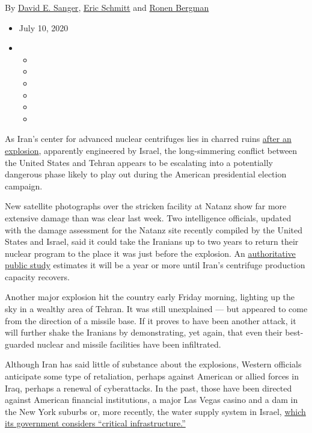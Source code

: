 By \href{https://www.nytimes.com/by/david-e-sanger}{David E. Sanger},
\href{https://www.nytimes.com/by/eric-schmitt}{Eric Schmitt} and
\href{https://www.nytimes.com/by/ronen-bergman}{Ronen Bergman}

\begin{itemize}
\item
  July 10, 2020
\item
  \begin{itemize}
  \item
  \item
  \item
  \item
  \item
  \item
  \end{itemize}
\end{itemize}

As Iran's center for advanced nuclear centrifuges lies in charred ruins
\href{https://www.nytimes.com/2020/07/05/world/middleeast/iran-Natanz-nuclear-damage.html}{after
an explosion}, apparently engineered by Israel, the long-simmering
conflict between the United States and Tehran appears to be escalating
into a potentially dangerous phase likely to play out during the
American presidential election campaign.

New satellite photographs over the stricken facility at Natanz show far
more extensive damage than was clear last week. Two intelligence
officials, updated with the damage assessment for the Natanz site
recently compiled by the United States and Israel, said it could take
the Iranians up to two years to return their nuclear program to the
place it was just before the explosion. An
\href{https://isis-online.org/isis-reports/detail/damage-to-the-iran-centrifuge-assembly-center-icac-at-natanz/}{authoritative
public study} estimates it will be a year or more until Iran's
centrifuge production capacity recovers.

Another major explosion hit the country early Friday morning, lighting
up the sky in a wealthy area of Tehran. It was still unexplained --- but
appeared to come from the direction of a missile base. If it proves to
have been another attack, it will further shake the Iranians by
demonstrating, yet again, that even their best-guarded nuclear and
missile facilities have been infiltrated.

Although Iran has said little of substance about the explosions, Western
officials anticipate some type of retaliation, perhaps against American
or allied forces in Iraq, perhaps a renewal of cyberattacks. In the
past, those have been directed against American financial institutions,
a major Las Vegas casino and a dam in the New York suburbs or, more
recently, the water supply system in Israel,
\href{https://www.nytimes.com/2020/05/19/world/middleeast/israel-iran-cyberattacks.html}{which
its government considers ``critical infrastructure.''}

